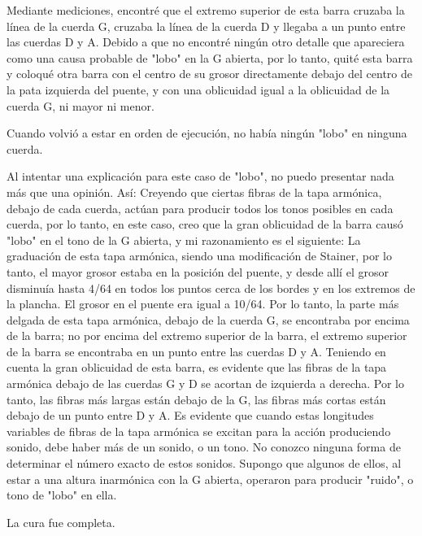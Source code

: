 \documentclass[12pt]{book}
\begin{document}
Mediante mediciones, encontré que el extremo superior de esta barra cruzaba la línea de la cuerda G, cruzaba la línea de la cuerda D y llegaba a un punto entre las cuerdas D y A. Debido a que no encontré ningún otro detalle que apareciera como una causa probable de "lobo" en la G abierta, por lo tanto, quité esta barra y coloqué otra barra con el centro de su grosor directamente debajo del centro de la pata izquierda del puente, y con una oblicuidad igual a la oblicuidad de la cuerda G, ni mayor ni menor.

Cuando volvió a estar en orden de ejecución, no había ningún "lobo" en ninguna cuerda.

Al intentar una explicación para este caso de "lobo", no puedo presentar nada más que una opinión. Así: Creyendo que ciertas fibras de la tapa armónica, debajo de cada cuerda, actúan para producir todos los tonos posibles en cada cuerda, por lo tanto, en este caso, creo que la gran oblicuidad de la barra causó "lobo" en el tono de la G abierta, y mi razonamiento es el siguiente: La graduación de esta tapa armónica, siendo una modificación de Stainer, por lo tanto, el mayor grosor estaba en la posición del puente, y desde allí el grosor disminuía hasta 4/64 en todos los puntos cerca de los bordes y en los extremos de la plancha. El grosor en el puente era igual a 10/64. Por lo tanto, la parte más delgada de esta tapa armónica, debajo de la cuerda G, se encontraba por encima de la barra; no por encima del extremo superior de la barra, el extremo superior de la barra se encontraba en un punto entre las cuerdas D y A. Teniendo en cuenta la gran oblicuidad de esta barra, es evidente que las fibras de la tapa armónica debajo de las cuerdas G y D se acortan de izquierda a derecha. Por lo tanto, las fibras más largas están debajo de la G, las fibras más cortas están debajo de un punto entre D y A. Es evidente que cuando estas longitudes variables de fibras de la tapa armónica se excitan para la acción produciendo sonido, debe haber más de un sonido, o un tono. No conozco ninguna forma de determinar el número exacto de estos sonidos. Supongo que algunos de ellos, al estar a una altura inarmónica con la G abierta, operaron para producir "ruido", o tono de "lobo" en ella.

La cura fue completa.
\end{document}
